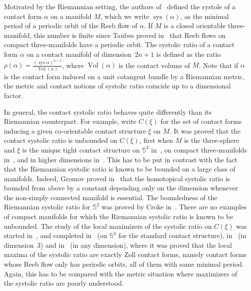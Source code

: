 \documentclass[AHL,Unicode,longabstracts]{cedram}
\DeclareMathOperator{\vol}{Vol}
\DeclareMathOperator{\sys}{sys}
\newcommand{\bbS}{\mathbb{S}}
\newcommand{\bbS}{\mathbb{S}}
\begin{document}
Motivated by the Riemannian setting, the authors of~\cite{paiva_2014_contact} defined the systole of a contact form $\alpha$ on a manifold $M$, which we write $\sys(\alpha)$, as the minimal period of a periodic orbit of the Reeb flow of $\alpha$. If $M$ is a closed orientable three-manifold, this number is finite since Taubes proved in~\cite{10.2140/gt.2007.11.2117} that Reeb flows on compact three-manifolds have a periodic orbit. The systolic ratio of a contact form $\alpha$ on a contact manifold of dimension~$2n+1$ is defined as the ratio $\rho(\alpha) = \frac{(\sys \alpha)^{n+1}}{\vol(\alpha)}$, where $\vol(\alpha)$ is the contact volume of $M$. Note that if $\alpha$ is the contact form induced on a unit cotangent bundle by a Riemannian metric, the metric and contact notions of systolic ratio coincide up to a dimensional factor.

In general, the contact systolic ratio behaves quite differently than its Riemannian counterpart. For example, write $C(\xi)$ for the set of contact forms inducing a given co-orientable contact structure $\xi$ on $M$. It was proved that the contact systolic ratio is unbounded on $C(\xi)$, first when $M$ is the three-sphere and $\xi$ is the unique tight contact structure on $\bbS^3$ in~\cite{Abbondandolo2018}, on compact three-manifolds in~\cite{Abbondandolo2019}, and in higher dimensions in~\cite{Saglam_2021}. This has to be put in contrast with the fact that the Riemannian systolic ratio is known to be bounded on a large class of manifolds. Indeed, Gromov proved in~\cite{MR0697984} that the homotopical systolic ratio is bounded from above by a constant depending only on the dimension whenever the non-simply connected manifold is essential. The boundedness of the Riemannian systolic ratio for $\bbS^2$ was proved by Croke in~\cite{MR0918453}. There are no examples of compact manifolds for which the Riemannian systolic ratio is known to be unbounded. The study of the local maximizers of the systolic ratio on $C(\xi)$ was started in~\cite{paiva_2014_contact}, and completed in~\cite{Abbondandolo2018} (on $\bbS^3$ for the standard contact structure), in~\cite{benedetti_kang_2020} (in dimension~3) and in~\cite{Abbondandolo_Benedetti_2023} (in any dimension), where it was proved that the local maxima of the systolic ratio are exactly Zoll contact forms, namely contact forms whose Reeb flow only has periodic orbits, all of them with same minimal period. Again, this has to be compared with the metric situation where maximizers of the systolic ratio are poorly understood.
\end{document}
